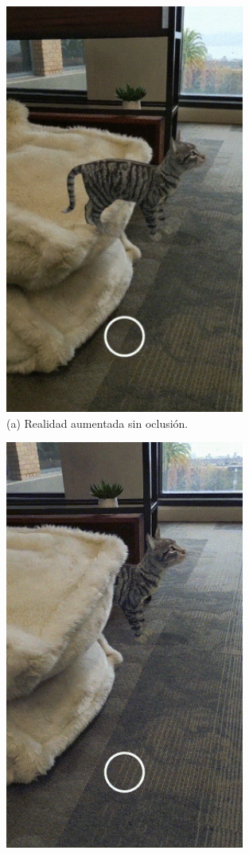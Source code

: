 \begin{figure}[H]
\centering
    \hspace{-4mm}
    \begin{minipage}{0.5\textwidth}
        \centering
        \includegraphics[scale=0.5]{Images/Estado del arte/nooclussion.jpg}\\
        (a) Realidad aumentada sin oclusión.
    \end{minipage}
    \begin{minipage}{0.5\textwidth}
        \centering
        \includegraphics[scale=0.5]{Images/Estado del arte/sioclussion.jpg}\\

\end{minipage}
\end{figure}
